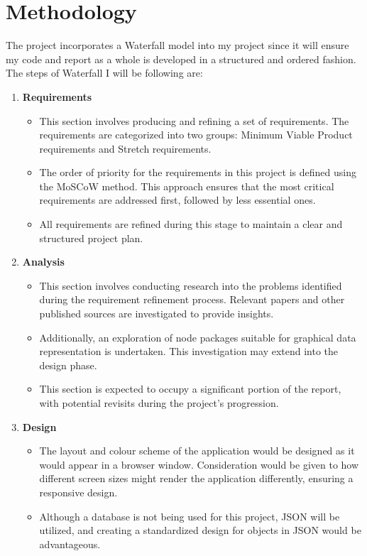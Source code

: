 \documentclass{report}
\begin{document}
\chapter{Methodology}
The project incorporates a Waterfall model into my project since it will ensure my code and report as a whole is developed in a structured and ordered fashion.\\
The steps of Waterfall I will be following are:
\begin{enumerate}
    \item \textbf{\large{Requirements}}
    \begin{itemize}
        \item This section involves producing and refining a set of requirements. The requirements are categorized into two groups: Minimum Viable Product requirements and Stretch requirements.
        \item The order of priority for the requirements in this project is defined using the MoSCoW method. This approach ensures that the most critical requirements are addressed first, followed by less essential ones.
        \item All requirements are refined during this stage to maintain a clear and structured project plan.
    \end{itemize}
    \item \textbf{\large{Analysis}}
    \begin{itemize}
        \item This section involves conducting research into the problems identified during the requirement refinement process. Relevant papers and other published sources are investigated to provide insights.
        \item Additionally, an exploration of node packages suitable for graphical data representation is undertaken. This investigation may extend into the design phase.
        \item This section is expected to occupy a significant portion of the report, with potential revisits during the project's progression.
    \end{itemize}
    \item \textbf{\large{Design}}
    \begin{itemize}
        \item The layout and colour scheme of the application would be designed as it would appear in a browser window. Consideration would be given to how different screen sizes might render the application differently, ensuring a responsive design.
        \item Although a database is not being used for this project, JSON will be utilized, and creating a standardized design for objects in JSON would be advantageous.

\end{itemize}
\end{enumerate}
\end{document}

